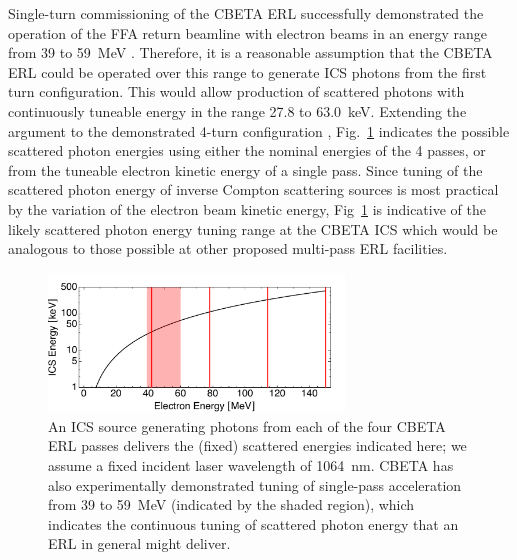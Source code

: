 \documentclass[../main.tex]{subfiles}
\begin{document}
Single-turn commissioning of the CBETA ERL successfully demonstrated the operation of the FFA return beamline with electron beams in an energy range from 39 to 59~\si{\mega\electronvolt} \cite{gulliford2019beam,gulliford2021measurement}. Therefore, it is a reasonable assumption that the CBETA ERL could be operated over this range to generate ICS photons from the first turn configuration. This would allow production of scattered photons with continuously tuneable energy in the range 27.8 to 63.0~\si{\kilo\electronvolt}. Extending the argument to the demonstrated 4-turn configuration \cite{bartnik2020cbeta}, Fig.~\ref{fig:CBETA_ICS_energy_tuning} indicates the possible scattered photon energies using either the nominal energies of the 4 passes, or from the tuneable electron kinetic energy of a single pass. Since tuning of the scattered photon energy of inverse Compton scattering sources is most practical by the variation of the electron beam kinetic energy, Fig~\ref{fig:CBETA_ICS_energy_tuning} is indicative of the likely scattered photon energy tuning range at the CBETA ICS which would be analogous to those possible at other proposed multi-pass ERL facilities.  
\begin{figure}[!h]
\centering
\includegraphics[width=0.7\textwidth]{Figures/CBETA_Inverse_Compton_Source_Design/CBETA_ICS_energy_tuning.pdf}
\caption{An ICS source generating photons from each of the four CBETA ERL passes delivers the (fixed) scattered energies indicated here; we assume a fixed incident laser wavelength of 1064~\si{\nano\meter}. CBETA has also experimentally demonstrated tuning of single-pass acceleration from 39 to 59~\si{\mega\electronvolt} (indicated by the shaded region), which indicates the continuous tuning of scattered photon energy that an ERL in general might deliver.}
\label{fig:CBETA_ICS_energy_tuning}
\end{figure}
\end{document}
